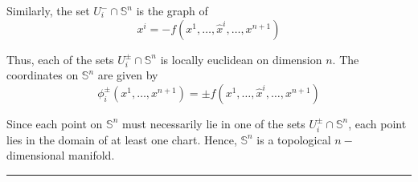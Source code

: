 \documentclass{article}
\begin{document}
Similarly, the set $U_i^{-} \cap \mathbb{S}^n$ is the graph of 
\[ x^i = -f(x^1, \dots, \hat{x}^i, \dots, x^{n+1}) \]

Thus, each of the sets $U_i^{\pm} \cap \mathbb{S}^n$ is locally euclidean on dimension $n$. The coordinates on $\mathbb{S}^n$ are given by 
\[ \phi_{i}^{\pm}(x^1, \dots, x^{n+1}) = \pm f(x^1, \dots, \hat{x}^i, \dots, x^{n+1}) \]

Since each point on $\mathbb{S}^n$ must necessarily lie in one of the sets $U_i^{\pm} \cap \mathbb{S}^n$, each point lies in the domain of at least one chart. Hence, $\mathbb{S}^n$ is a topological $n-$dimensional manifold.

\vskip 0.5cm
\hrule 
\vskip 0.5cm

\end{document}
